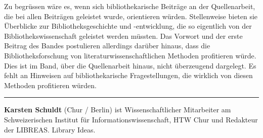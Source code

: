 \documentclass[a4paper,
fontsize=11pt,
oneside,
numbers=noperiodatend,
parskip=half-,
bibliography=totoc,
final
]{scrartcl}
\begin{document}
Zu begrüssen wäre es, wenn sich bibliothekarische Beiträge an der
Quellenarbeit, die bei allen Beiträgen geleistet wurde, orientieren
würden. Stellenweise bieten sie Überblicke zur Bibliotheksgeschichte und
-entwicklung, die so eigentlich von der Bibliothekswissenschaft
geleistet werden müssten. Das Vorwort und der erste Beitrag des Bandes
postulieren allerdings darüber hinaus, dass die Bibliotheksforschung von
literaturwissenschaftlichen Methoden profitieren würde. Dies ist im
Band, über die Quellenarbeit hinaus, nicht überzeugend dargelegt. Es
fehlt an Hinweisen auf bibliothekarische Fragestellungen, die wirklich
von diesen Methoden profitieren würden.

\begin{center}\rule{0.5\linewidth}{\linethickness}\end{center}

\textbf{Karsten Schuldt} (Chur / Berlin) ist Wissenschaftlicher
Mitarbeiter am Schweizerischen Institut für Informationswissenschaft,
HTW Chur und Redakteur der LIBREAS. Library Ideas.
\end{document}
